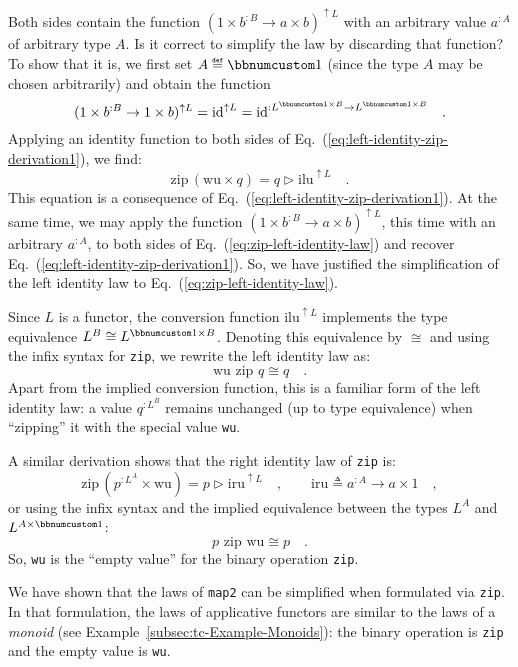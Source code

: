 Both sides contain the function $(1\times b^{:B}\rightarrow a\times b)^{\uparrow L}$
with an arbitrary value $a^{:A}$ of arbitrary type $A$. Is it correct
to simplify the law by discarding that function? To show that it is,
we first set $A\triangleq\bbnum 1$ (since the type $A$ may be chosen
arbitrarily) and obtain the function 
\[
(1\times b^{:B}\rightarrow1\times b)^{\uparrow L}=\text{id}^{\uparrow L}=\text{id}^{:L^{\bbnum 1\times B}\rightarrow L^{\bbnum 1\times B}}\quad.
\]
Applying an identity function to both sides of Eq.~(\ref{eq:left-identity-zip-derivation1}),
we find:
\begin{equation}
\text{zip}\,(\text{wu}\times q)=q\triangleright\text{ilu}^{\uparrow L}\quad.\label{eq:zip-left-identity-law}
\end{equation}
This equation is a consequence of Eq.~(\ref{eq:left-identity-zip-derivation1}).
At the same time, we may apply the function $(1\times b^{:B}\rightarrow a\times b)^{\uparrow L}$,
this time with an arbitrary $a^{:A}$, to both sides of Eq.~(\ref{eq:zip-left-identity-law})
and recover Eq.~(\ref{eq:left-identity-zip-derivation1}). So, we
have justified the simplification of the left identity law to Eq.~(\ref{eq:zip-left-identity-law}).

Since $L$ is a functor, the conversion function $\text{ilu}^{\uparrow L}$
implements the type equivalence $L^{B}\cong L^{\bbnum 1\times B}$.
Denoting this equivalence by $\cong$ and using the infix syntax for
\lstinline!zip!, we rewrite the left identity law as:
\[
\text{wu}\,\,\text{zip}\,\,q\cong q\quad.
\]
Apart from the implied conversion function, this is a familiar form
of the left identity law: a value $q^{:L^{B}}$ remains unchanged
(up to type equivalence) when \textsf{``}zipping\textsf{''} it with the special value
\lstinline!wu!.

A similar derivation shows that the right identity law of \lstinline!zip!
is:
\[
\text{zip}\,(p^{:L^{A}}\times\text{wu})=p\triangleright\text{iru}^{\uparrow L}\quad,\quad\quad\text{iru}\triangleq a^{:A}\rightarrow a\times1\quad,
\]
or using the infix syntax and the implied equivalence between the
types $L^{A}$ and $L^{A\times\bbnum 1}$:
\[
p\,\,\text{zip}\,\,\text{wu}\cong p\quad.
\]
So, \lstinline!wu! is the \textsf{``}empty value\textsf{''} for the binary operation
\lstinline!zip!.

We have shown that the laws of \lstinline!map2! can be simplified
when formulated via \lstinline!zip!. In that formulation, the laws
of applicative functors are similar to the laws of a \emph{monoid}
(see Example~\ref{subsec:tc-Example-Monoids}): the binary operation
is \lstinline!zip! and the empty value is \lstinline!wu!. 

